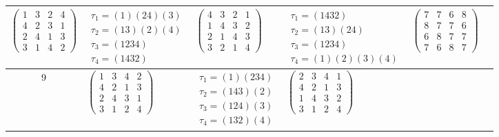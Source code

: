 \begin{longtable}{|c|p{2.7cm}|p{2.7cm}|p{2.7cm}|p{2.7cm}|p{2.7cm}|}
    $\begin{pmatrix} 1 & 3 & 2 & 4 \\ 4 & 2 & 3 & 1 \\ 2 & 4 & 1 & 3 \\ 3 & 1 & 4 & 2 \end{pmatrix}$               &
    $\begin{array}{l}\tau_{1}=(1)(24)(3)\\ \tau_{2}=(13)(2)(4)\\ \tau_{3}=(1234)\\ \tau_{4}=(1432)\end{array}$     &
    $\begin{pmatrix} 4 & 3 & 2 & 1 \\ 1 & 4 & 3 & 2 \\ 2 & 1 & 4 & 3 \\ 3 & 2 & 1 & 4 \end{pmatrix}$               &
    $\begin{array}{l}\tau_{1}=(1432)\\ \tau_{2}=(13)(24)\\ \tau_{3}=(1234)\\ \tau_{4}=(1)(2)(3)(4)\end{array}$     &
    $\begin{pmatrix} 7 & 7 & 6 & 8 \\ 8 & 7 & 7 & 6 \\ 6 & 8 & 7 & 7 \\ 7 & 6 & 8 & 7 \end{pmatrix}$                                                                                           \\
    \hline
    9                                                                                                              &
    $\begin{pmatrix} 1 & 3 & 4 & 2 \\ 4 & 2 & 1 & 3 \\ 2 & 4 & 3 & 1 \\ 3 & 1 & 2 & 4 \end{pmatrix}$               &
    $\begin{array}{l}\tau_{1}=(1)(234)\\ \tau_{2}=(143)(2)\\ \tau_{3}=(124)(3)\\ \tau_{4}=(132)(4)\end{array}$     &
    $\begin{pmatrix} 2 & 3 & 4 & 1 \\ 4 & 2 & 1 & 3 \\ 1 & 4 & 3 & 2 \\ 3 & 1 & 2 & 4 \end{pmatrix}$               &

\end{longtable}
